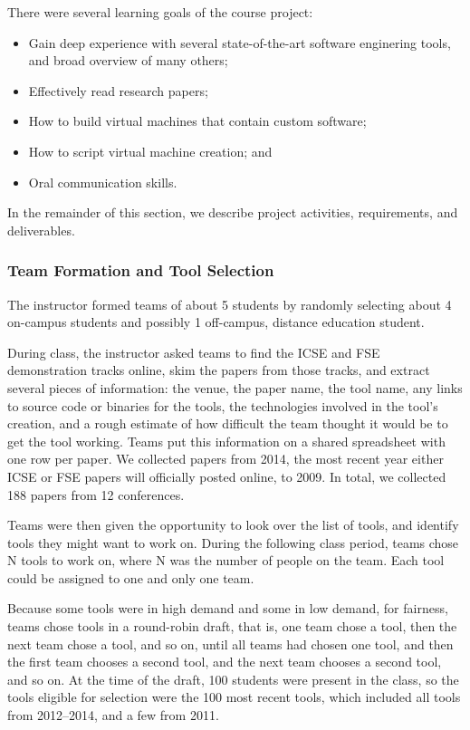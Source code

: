 \documentclass[10pt,conference]{IEEEtran}
\begin{document}
There were several learning goals of the course project:

\begin{itemize}
  \item Gain deep experience with several state-of-the-art
  		software enginering tools, and broad overview of many others;
  \item Effectively read research papers;
  \item How to build virtual machines that contain custom
  		software;
  \item How to script virtual machine creation; and
  \item Oral communication skills. 
\end{itemize}

In the remainder of this section, we describe project
activities, requirements, and deliverables.

\subsubsection{Team Formation and Tool Selection}

The instructor formed teams of about 5 students by randomly
selecting about 4 on-campus students and possibly 1 off-campus, distance
education student.

During class, the instructor asked teams to find the ICSE
and FSE demonstration tracks online, skim the papers from those
tracks, and extract several pieces of information:
the venue, the paper name, the tool name, any links to source
code or binaries for the tools, the technologies involved in the 
tool's creation, and a rough estimate of how 
difficult the team thought it would be to get the tool working.
Teams put this information on a shared spreadsheet with one row per paper.
We collected papers from 2014, the most recent year either ICSE or FSE
papers will officially posted online, to 2009.
In total, we collected 188 papers from 12 conferences.

Teams were then given the opportunity to look over the list of
tools, and identify tools they might want to work on.
During the following class period, teams chose N tools to work on,
where N was the number of people on the team.
Each tool could be assigned to one and only one team.

Because some tools were in high demand and some in low demand, for fairness,
teams chose tools in a round-robin draft,
that is, one team chose a tool, then the next team chose a tool, and so on,
until all teams had chosen one tool, and then the first team chooses a second
tool, and the next team chooses a second tool, and so on.
At the time of the draft, 100 students were present in the class, so the tools eligible
for selection were the 100 most recent tools, which included all tools
from 2012--2014, and a few from 2011.
\end{document}
